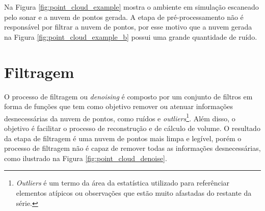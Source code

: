 Na Figura \ref{fig:point_cloud_example} mostra o ambiente em simulação escaneado pelo sonar e a nuvem de pontos gerada.
A etapa de pré-processamento não é responsável por filtrar a nuvem de pontos, por esse motivo que a nuvem gerada na Figura \ref{fig:point_cloud_example_b} possui uma grande quantidade de ruído.


\section{Filtragem}
\label{sec:filtragem}

O processo de filtragem ou \textit{denoising} é composto por um conjunto de filtros em forma de funções que tem como objetivo remover ou atenuar informações desnecessárias da nuvem de pontos, como ruídos e \textit{outliers}\footnote{\textit{Outliers} é um termo da área da estatística utilizado para referênciar elementos atípicos ou observações que estão muito afastadas do restante da série.}.
Além disso, o objetivo é facilitar o processo de reconstrução e de cálculo de volume.
O resultado da etapa de filtragem é uma nuvem de pontos mais limpa e legível, porém o processo de filtragem não é capaz de remover todas as informações desnecessárias, como ilustrado na Figura \ref{fig:point_cloud_denoise}.


